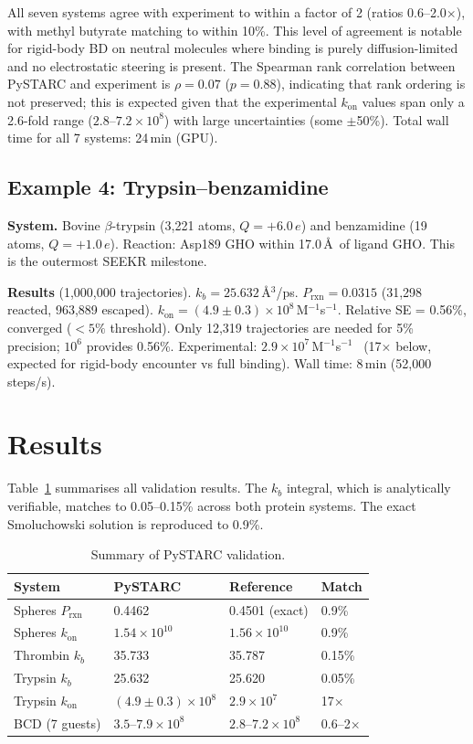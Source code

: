\documentclass[journal=jctcce,manuscript=article,layout=twocolumn]{achemso}
\newcommand{\kon}{k_{\mathrm{on}}}
\newcommand{\Prxn}{P_{\mathrm{rxn}}}
\begin{document}
All seven systems agree with experiment to within a factor of 2
(ratios 0.6--2.0$\times$), with methyl butyrate matching to
within 10\%.
This level of agreement is notable for rigid-body BD on neutral
molecules where binding is purely diffusion-limited and no
electrostatic steering is present.
The Spearman rank correlation between PySTARC and experiment is
$\rho = 0.07$ ($p = 0.88$), indicating that rank ordering is not
preserved; this is expected given that the experimental $\kon$
values span only a 2.6-fold range ($2.8$--$7.2 \times 10^8$) with
large uncertainties (some $\pm$50\%).
Total wall time for all 7 systems: 24\,min (GPU).

\subsection{Example 4: Trypsin--benzamidine}

\textbf{System.}
Bovine $\beta$-trypsin (3{,}221 atoms, $Q = +6.0\,e$) and
benzamidine (19 atoms, $Q = +1.0\,e$).
Reaction: Asp189 GHO within 17.0\,\AA\ of ligand GHO.
This is the outermost SEEKR milestone.

\textbf{Results} (1{,}000{,}000 trajectories).
$k_b = 25.632$\,\AA$^3$/ps.
$\Prxn = 0.0315$ (31{,}298 reacted, 963{,}889 escaped).
$\kon = (4.9 \pm 0.3) \times 10^8$\,M$^{-1}$s$^{-1}$.
Relative SE = 0.56\%, converged ($<5\%$ threshold).
Only 12{,}319 trajectories are needed for 5\% precision;
$10^6$ provides 0.56\%.
Experimental: $2.9 \times 10^7$\,M$^{-1}$s$^{-1}$~\cite{Guillain1970}
(17$\times$ below, expected for rigid-body encounter vs full binding).
Wall time: 8\,min (52{,}000 steps/s).


\section{Results}
\label{sec:results}

Table~\ref{tab:summary} summarises all validation results.
The $k_b$ integral, which is analytically verifiable, matches to
0.05--0.15\% across both protein systems.
The exact Smoluchowski solution is reproduced to 0.9\%.

\begin{table}[h]
\caption{Summary of PySTARC validation.}
\label{tab:summary}
\footnotesize
\begin{tabular}{llll}
\toprule
System & PySTARC & Reference & Match \\
\midrule
Spheres $\Prxn$ & 0.4462 & 0.4501 (exact) & 0.9\% \\
Spheres $\kon$ & $1.54{\times}10^{10}$ & $1.56{\times}10^{10}$ & 0.9\% \\
Thrombin $k_b$ & 35.733 & 35.787 & 0.15\% \\
Trypsin $k_b$ & 25.632 & 25.620 & 0.05\% \\
Trypsin $\kon$ & $(4.9{\pm}0.3){\times}10^{8}$ & $2.9{\times}10^7$ & 17$\times$ \\
BCD (7 guests) & $3.5$--$7.9{\times}10^{8}$ & $2.8$--$7.2{\times}10^{8}$ & 0.6--2$\times$ \\
\bottomrule
\end{tabular}
\end{table}
\end{document}
